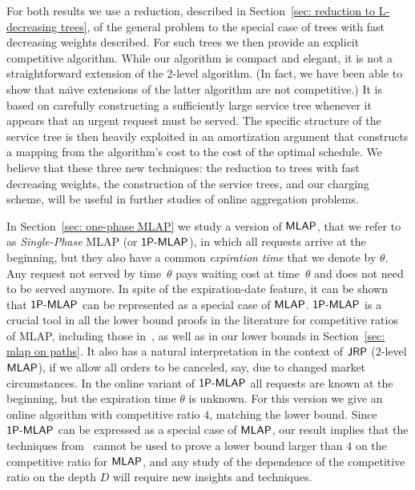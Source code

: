\documentclass[a4paper]{article}
\newcommand{\JRP}{\mbox{\rm\textsf{JRP}}}
\newcommand{\MLAP}{\mbox{\rm\textsf{MLAP}}}
\newcommand{\SPMLAP}{\mbox{\rm\textsf{1P-MLAP}}}
\newcommand{\expiration}{\theta}
\begin{document}
For both results we use a reduction, described in Section~\ref{sec: reduction to L-decreasing trees},
of the general problem to the special case of trees with fast decreasing weights described. 
For such trees we then provide an explicit competitive algorithm. 
While our algorithm is compact and elegant, it is not a straightforward
extension of the 2-level algorithm.  (In fact, we have been able to show that na\"{\i}ve 
extensions of the latter algorithm are not competitive.)
It is based on carefully constructing a sufficiently large service tree
whenever it appears that an urgent request must be served. The specific structure of the service 
tree is then heavily exploited in an amortization argument that constructs a
mapping from the algorithm's cost to the cost of the optimal schedule.
We believe that these three new techniques: the reduction to trees with fast decreasing weights,
the construction of the service trees, and our charging scheme, 
will be useful in further studies of online aggregation problems.

In Section~\ref{sec: one-phase MLAP} we study a version of
$\MLAP$, that we refer to as \emph{Single-Phase} {\MLAP} (or
$\SPMLAP$), in which all requests arrive at the beginning, but they
also have a common \emph{expiration time} that we denote by
$\expiration$.  Any request not served by time~$\expiration$ pays
waiting cost at time~$\expiration$ and does not need to be served
anymore. In spite of the expiration-date feature, it can be shown that
$\SPMLAP$ can be represented as a special case of $\MLAP$.  
$\SPMLAP$ is a crucial tool in all the lower bound proofs in the literature
for competitive ratios of {\MLAP}, including those in~\cite{jrp-online-buchbinder,aggregation_wads_2013}, 
as well as in our lower bounds in Section~\ref{sec: mlap on paths}. 
It also has a natural interpretation in the context of $\JRP$ ($2$-level $\MLAP$), if we
allow all orders to be canceled, say, due to changed market
circumstances.  In the online variant of $\SPMLAP$ all requests are
known at the beginning, but the expiration time $\expiration$ is
unknown.  For this version we give an online algorithm with
competitive ratio $4$, matching the lower bound.
Since $\SPMLAP$ can be expressed as a special case of $\MLAP$, our result
implies that the techniques
from~\cite{jrp-online-buchbinder,aggregation_wads_2013} cannot be used
to prove a lower bound larger than $4$ on the competitive ratio for $\MLAP$,
and any study of the dependence of the competitive
ratio on the depth $D$ will require new insights and techniques.
\end{document}

